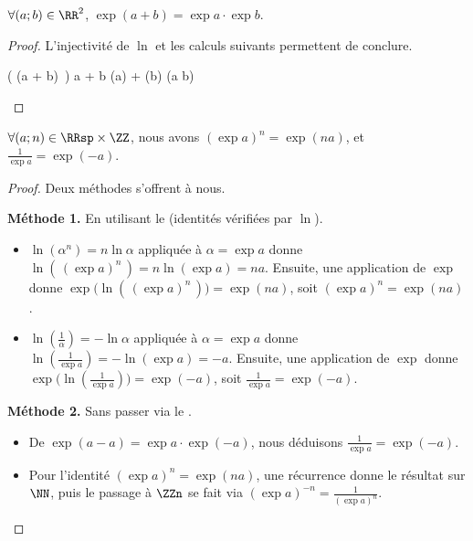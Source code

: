 \begin{fact}
	$\forall (a;b) \in \RR^2$,
	$\exp(a + b) = \exp a \cdot \exp b$.
\end{fact}


\begin{proof}
	L'injectivité de $\ln$ et les calculs suivants permettent de conclure.
	
	\begin{stepcalc}[style=ar*]
		\ln \big( \exp(a + b) \,\big)
		a + b
		\ln(\exp a) + \ln(\exp b)
		\ln(\exp a \cdot \exp b)
	\end{stepcalc}

	\null
	\vspace{-4ex}
\end{proof}




\begin{fact} \label{exp-id}
	$\forall (a;n) \in \RRsp \times \ZZ$,
	nous avons
	$(\exp a)^n = \exp(n a)$,
	et
	$\frac{1}{\exp a} = \exp(- a)$.
\end{fact}


\begin{proof}
	Deux méthodes s'offrent à nous.
	
	\smallskip
	\textbf{Méthode 1.} En utilisant le  (identités vérifiées par $\ln$).
	\begin{itemize}
		\item $\ln(\alpha^n) = n \ln \alpha$ appliquée à $\alpha = \exp a$ donne
		$\ln(\,(\exp a)^n\,) = n \ln(\exp a) = n a$.
		Ensuite,
		une application de $\exp$ donne
		$\exp\big( \ln(\,(\exp a)^n\,) \big) = \exp(n a)$,
		soit
		$(\exp a)^n = \exp(n a)$.


		\item $\ln(\frac{1}{\alpha}) = - \ln \alpha$ appliquée à $\alpha = \exp a$ donne
		$\ln(\frac{1}{\exp a}) = - \ln(\exp a) = - a$.
		Ensuite,
		une application de $\exp$ donne
		$\exp\big( \ln(\frac{1}{\exp a}) \big) = \exp(- a)$,
		soit
		$\frac{1}{\exp a} = \exp(- a)$.		
	\end{itemize}

	
	\smallskip
	\textbf{Méthode 2.} Sans passer via le \reffact{ln-id}.
	\begin{itemize}
		\item De $\exp(a - a) = \exp a \cdot \exp(- a)$, nous déduisons $\frac{1}{\exp a} = \exp(- a)$.


		\item Pour l'identité $(\exp a)^n = \exp(n a)$, une récurrence donne le résultat sur $\NN$, puis le passage à $\ZZn$ se fait via $(\exp a)^{-n} = \frac{1}{(\exp a)^n}$.
	\end{itemize}
	
	\null
	\vspace{-5ex}
\end{proof}